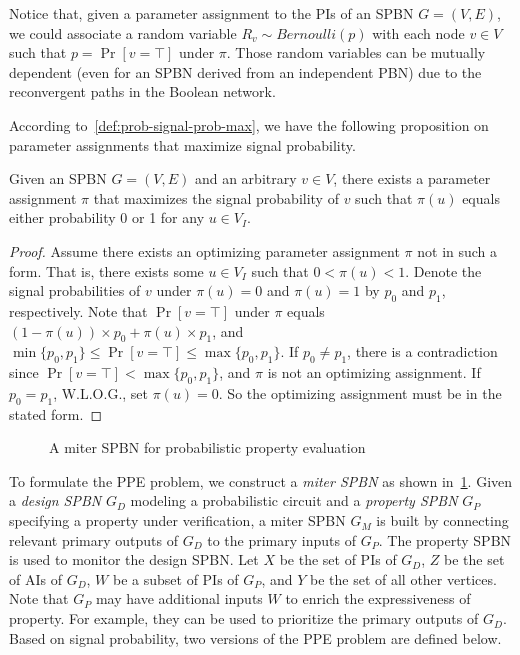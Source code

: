 Notice that, given a parameter assignment to the PIs of an SPBN $G=(V,E)$,
we could associate a random variable $R_v\sim\textit{Bernoulli}(p)$ with each node $v \in V$
such that $p=\Pr[v=\top]$ under $\pi$.
Those random variables can be mutually dependent (even for an SPBN derived from an independent PBN)
due to the reconvergent paths in the Boolean network.

According to~\cref{def:prob-signal-prob-max},
we have the following proposition on parameter assignments that maximize signal probability.

\begin{proposition}
    Given an SPBN $G=(V,E)$ and an arbitrary $v \in V$,
    there exists a parameter assignment $\pi$ that maximizes the signal probability of $v$
    such that $\pi(u)$ equals either probability 0 or 1 for any $u \in V_I$.
\end{proposition}
\begin{proof}
    Assume there exists an optimizing parameter assignment $\pi$ not in such a form.
    That is, there exists some $u \in V_I$ such that $0<\pi(u)<1$.
    Denote the signal probabilities of $v$ under $\pi(u)=0$ and $\pi(u)=1$ by $p_0$ and $p_1$, respectively.
    Note that $\Pr[v=\top]$ under $\pi$ equals $(1-\pi(u)) \times p_0 + \pi(u) \times p_1$,
    and $\min\{p_0,p_1\}\leq\Pr[v=\top]\leq\max\{p_0,p_1\}$.
    If $p_0 \neq p_1$,
    there is a contradiction since $\Pr[v=\top]<\max\{p_0,p_1\}$,
    and $\pi$ is not an optimizing assignment.
    If $p_0=p_1$, W.L.O.G., set $\pi(u)=0$.
    So the optimizing assignment must be in the stated form.
\end{proof}

\begin{figure}[t]
    \centering
    
    \caption{A miter SPBN for probabilistic property evaluation}
    \label{fig:prob-spbn-miter}
\end{figure}

To formulate the PPE problem,
we construct a \textit{miter SPBN} as shown in~\cref{fig:prob-spbn-miter}.
Given a \textit{design SPBN} $G_D$ modeling a probabilistic circuit and
a \textit{property SPBN} $G_P$ specifying a property under verification,
a miter SPBN $G_M$ is built by connecting relevant primary outputs of $G_D$ to the primary inputs of $G_P$.
The property SPBN is used to monitor the design SPBN.
Let $X$ be the set of PIs of $G_D$,
$Z$ be the set of AIs of $G_D$,
$W$ be a subset of PIs of $G_P$,
and $Y$ be the set of all other vertices.
Note that $G_P$ may have additional inputs $W$ to enrich the expressiveness of property.
For example, they can be used to prioritize the primary outputs of $G_D$.
Based on signal probability,
two versions of the PPE problem are defined below.

